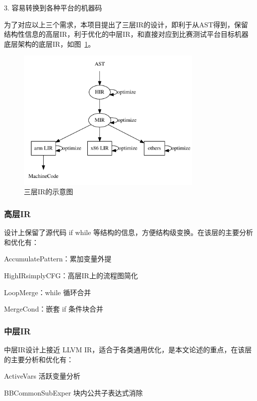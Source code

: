 3. 容易转换到各种平台的机器码

为了对应以上三个需求，本项目提出了三层IR的设计，即利于从AST得到，保留结构性信息的高层IR，利于优化的中层IR，和直接对应到比赛测试平台目标机器底层架构的底层IR，如图~\ref{fig:threeIR}。

\begin{figure}[htb]
  \centering
  \includegraphics[width=0.8\textwidth]{figures/three_layer_IR.dot.pdf}
  \caption{三层IR的示意图}
  \label{fig:threeIR}
\end{figure}

\subsubsection{高层IR}

设计上保留了源代码 if while 等结构的信息，方便结构级变换。在该层的主要分析和优化有：


AccumulatePattern：累加变量外提

HighIRsimplyCFG：高层IR上的流程图简化

LoopMerge：while 循环合并

MergeCond：嵌套 if 条件块合并

\subsubsection{中层IR}
中层IR设计上接近 LLVM IR，适合于各类通用优化，是本文论述的重点，在该层的主要分析和优化有：

ActiveVars   活跃变量分析

BBCommonSubExper   块内公共子表达式消除

